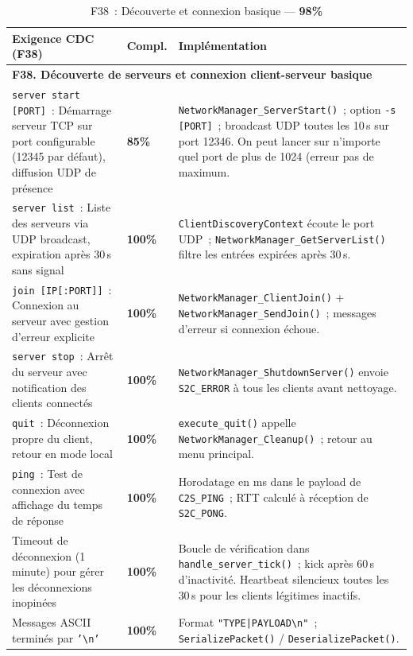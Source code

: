 \documentclass[a4paper]{article}
\begin{document}
\begin{table}[H]
\centering
\renewcommand{\arraystretch}{1.4}
\begin{tabular}{|p{6cm}|p{1.5cm}|p{8cm}|}
\hline
\textbf{Exigence CDC (F38)} & \textbf{Compl.} & \textbf{Implémentation} \\
\hline
\multicolumn{3}{|l|}{\textbf{F38. Découverte de serveurs et connexion client-serveur basique}} \\
\hline
\texttt{server start [PORT]}~: Démarrage serveur TCP sur port configurable (12345 par défaut), diffusion UDP de présence
& \textbf{85\%}
& \texttt{NetworkManager\_ServerStart()}~; option \texttt{-s [PORT]}~; broadcast UDP toutes les 10\,s sur port 12346. On peut lancer sur n'importe quel port de plus de 1024 (erreur pas de maximum. \\
\hline
\texttt{server list}~: Liste des serveurs via UDP broadcast, expiration après 30\,s sans signal
& \textbf{100\%}
& \texttt{ClientDiscoveryContext} écoute le port UDP~; \texttt{NetworkManager\_GetServerList()} filtre les entrées expirées après 30\,s. \\
\hline
\texttt{join [IP[:PORT]]}~: Connexion au serveur avec gestion d'erreur explicite
& \textbf{100\%}
& \texttt{NetworkManager\_ClientJoin()} + \texttt{NetworkManager\_SendJoin()}~; messages d'erreur si connexion échoue. \\
\hline
\texttt{server stop}~: Arrêt du serveur avec notification des clients connectés
& \textbf{100\%}
& \texttt{NetworkManager\_ShutdownServer()} envoie \texttt{S2C\_ERROR} à tous les clients avant nettoyage. \\
\hline
\texttt{quit}~: Déconnexion propre du client, retour en mode local
& \textbf{100\%}
& \texttt{execute\_quit()} appelle \texttt{NetworkManager\_Cleanup()}~; retour au menu principal. \\
\hline
\texttt{ping}~: Test de connexion avec affichage du temps de réponse
& \textbf{100\%}
& Horodatage en ms dans le payload de \texttt{C2S\_PING}~; RTT calculé à réception de \texttt{S2C\_PONG}. \\
\hline
Timeout de déconnexion (1 minute) pour gérer les déconnexions inopinées
& \textbf{100\%}
& Boucle de vérification dans \texttt{handle\_server\_tick()}~; kick après 60\,s d'inactivité. Heartbeat silencieux toutes les 30\,s pour les clients légitimes inactifs. \\
\hline
Messages ASCII terminés par \texttt{'\textbackslash{}n'}
& \textbf{100\%}
& Format \texttt{"TYPE|PAYLOAD\textbackslash{}n"}~; \texttt{SerializePacket()} / \texttt{DeserializePacket()}. \\
\hline
\end{tabular}
\caption{F38~: Découverte et connexion basique --- \textbf{98\%}}
\label{tab:f38}
\end{table}
 
\end{document}
